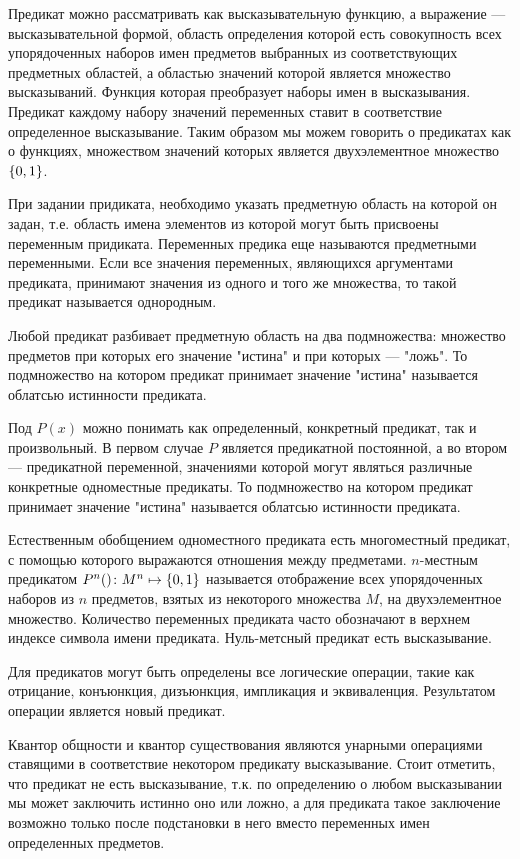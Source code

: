 \documentclass[letterpaper, 10pt]{article}
\theoremstyle{definition}
\begin{document}
	Предикат можно рассматривать как высказывательную функцию, а выражение ---
	высказывательной формой, область 
	определения которой есть совокупность всех упорядоченных наборов имен
	предметов выбранных из соответствующих предметных областей, а областью
	значений которой является множество высказываний. Функция которая
	преобразует наборы имен в высказывания.
	Предикат каждому набору значений переменных ставит в соответствие 
	определенное высказывание. Таким образом мы можем говорить о
	предикатах как о функциях, множеством значений которых является
	двухэлементное множество $\left\{0,1\right\}$.

	При задании придиката, необходимо указать предметную область на которой он
	задан, т.е. область имена элементов из которой могут быть присвоены
	переменным придиката. Переменных предика еще называются предметными
	переменными. Если все значения переменных, являющихся аргументами
	предиката, принимают значения из одного и того же множества, то такой
	предикат называется однородным.

	Любой предикат разбивает предметную область на два подмножества: множество
	предметов при которых его значение "истина" и при которых --- "ложь". То
	подмножество на котором предикат принимает значение "истина" называется
	облатсью истинности предиката.

	Под $P(x)$ можно понимать как определенный, конкретный предикат, так и
	произвольный. В первом случае $P$ является предикатной постоянной, а во
	втором --- предикатной переменной, значениями которой могут являться
	различные конкретные одноместные предикаты. То подмножество на котором предикат
	принимает значение "истина" называется облатсью истинности предиката.

	Естественным обобщением одноместного предиката есть многоместный предикат, с
	помощью которого выражаются отношения между предметами.
	$n$-местным предикатом $P^n(\rseq x)\colon M^n \mapsto \set{0,1}$ называется
	отображение всех упорядоченных наборов из $n$ предметов, взятых из
	некоторого множества $M$, на двухэлементное множество.  Количество
	переменных предиката часто обозначают в верхнем индексе символа имени
	предиката. Нуль-метсный предикат есть высказывание.

	Для предикатов могут быть определены все логические операции, такие как
	отрицание, конъюнкция, дизъюнкция, импликация и эквиваленция. Результатом
	операции является новый предикат.

	Квантор общности и квантор существования являются унарными операциями
	ставящими в соответствие некотором предикату высказывание. Стоит отметить,
	что предикат не есть высказывание, т.к. по определению о любом высказывании
	мы может заключить истинно оно или ложно, а для предиката такое заключение
	возможно только после подстановки в него вместо переменных имен определенных
	предметов.
\end{document}
